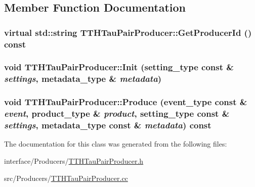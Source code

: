 \subsection{Member Function Documentation}
\hypertarget{classTTHTauPairProducer_aef3c8c8e85b3b7ed9174521bdf9895cd}{
\subsubsection[{GetProducerId}]{\setlength{\rightskip}{0pt plus 5cm}virtual std::string TTHTauPairProducer::GetProducerId () const}}
\label{classTTHTauPairProducer_aef3c8c8e85b3b7ed9174521bdf9895cd}
\hypertarget{classTTHTauPairProducer_a5b7682157f545adaf9a449e2507321e9}{
\subsubsection[{Init}]{\setlength{\rightskip}{0pt plus 5cm}void TTHTauPairProducer::Init (setting\_\-type const \& {\em settings}, \/  metadata\_\-type \& {\em metadata})}}
\label{classTTHTauPairProducer_a5b7682157f545adaf9a449e2507321e9}
\hypertarget{classTTHTauPairProducer_aaf6b62a254a117838bc6a46525df61d8}{
\subsubsection[{Produce}]{\setlength{\rightskip}{0pt plus 5cm}void TTHTauPairProducer::Produce (event\_\-type const \& {\em event}, \/  product\_\-type \& {\em product}, \/  setting\_\-type const \& {\em settings}, \/  metadata\_\-type const \& {\em metadata}) const}}
\label{classTTHTauPairProducer_aaf6b62a254a117838bc6a46525df61d8}


The documentation for this class was generated from the following files:\begin{DoxyCompactItemize}
\item 
interface/Producers/\hyperlink{TTHTauPairProducer_8h}{TTHTauPairProducer.h}\item 
src/Producers/\hyperlink{TTHTauPairProducer_8cc}{TTHTauPairProducer.cc}\end{DoxyCompactItemize}
